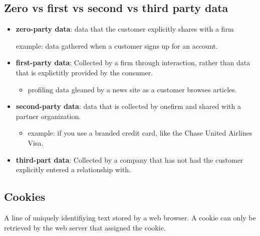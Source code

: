\documentclass{report}
\begin{document}
\subsection{Zero vs first vs second vs third party data}
\begin{itemize}
    \item \textbf{zero-party data}: data that the customer explicitly shares with a firm
        \begin{itemize}[label=$\circ$]
        example: data gathered when a customer signs up for an account.
        \end{itemize}
    \item \textbf{first-party data}: Collected by a firm through interaction, rather than data that is explictitly provided by the consumer. 
        \begin{itemize}[label=$\circ$]
            \item profiling data gleaned by a news site as a customer browses articles.
        \end{itemize}
    \item \textbf{second-party data}: data that is collected by onefirm and shared with a partner organization.
        \begin{itemize}[label=$\circ$]
            \item example: if you use a branded credit card, like the Chase United Airlines Visa.
        \end{itemize}
    \item \textbf{third-part data}: Collected by a company that has not had the customer explicitly entered a relationship with.
\end{itemize}
\subsection{Cookies}
A line of uniquely identifiying text stored by a web browser. A cookie can only be retrieved by the web server that assigned the cookie.
\end{document}
